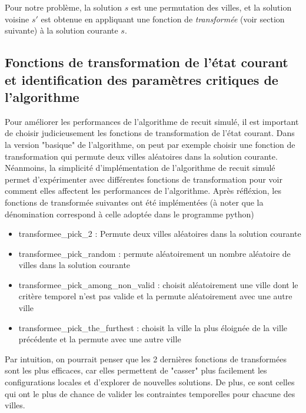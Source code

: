 \documentclass[a4paper, 12pt]{article}
\begin{document}
Pour notre problème, la solution $s$ est une permutation des villes, et la solution voisine $s'$ est obtenue en appliquant une fonction de \textit{transformée} (voir section suivante) à la solution courante $s$.

\subsection{Fonctions de transformation de l'état courant et identification des paramètres critiques de l'algorithme}
Pour améliorer les performances de l'algorithme de recuit simulé, il est important de choisir judicieusement les fonctions de transformation de l'état courant.
Dans la version "basique" de l'algorithme, on peut par exemple choisir une fonction de transformation qui permute deux villes aléatoires dans la solution courante.
Néanmoins, la simplicité d'implémentation de l'algorithme de recuit simulé permet d'expérimenter avec différentes fonctions de transformation pour voir comment elles affectent les performances de l'algorithme. 
Après réfléxion, les fonctions de transformée suivantes ont été implémentées (à noter que la dénomination correspond à celle adoptée dans le programme python)
\begin{itemize}
    \item transformee\_pick\_2 : Permute deux villes aléatoires dans la solution courante
    \item transformee\_pick\_random : permute aléatoirement un nombre aléatoire de villes dans la solution courante
    \item transformee\_pick\_among\_non\_valid : choisit aléatoirement une ville dont le critère temporel n'est pas valide et la permute aléatoirement avec une autre ville
    \item transformee\_pick\_the\_furthest : choisit la ville la plus éloignée de la ville précédente et la permute avec une autre ville
\end{itemize}

Par intuition, on pourrait penser que les 2 dernières fonctions de transformées sont les plus efficaces, car elles permettent de "casser" plus facilement les configurations locales et d'explorer de nouvelles solutions. De plus, ce sont celles qui ont le plus de chance de valider les contraintes temporelles pour chacune des villes.
\end{document}
